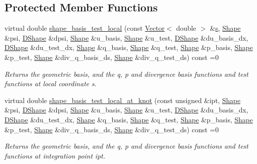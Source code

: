 \subsection*{Protected Member Functions}
\begin{DoxyCompactItemize}
\item 
virtual double \hyperlink{classoomph_1_1PoroelasticityEquations_a14fa3f0b43c4d7da65504702aef760bf}{shape\+\_\+basis\+\_\+test\+\_\+local} (const \hyperlink{classoomph_1_1Vector}{Vector}$<$ double $>$ \&\hyperlink{cfortran_8h_ab7123126e4885ef647dd9c6e3807a21c}{s}, \hyperlink{classoomph_1_1Shape}{Shape} \&psi, \hyperlink{classoomph_1_1DShape}{D\+Shape} \&dpsi, \hyperlink{classoomph_1_1Shape}{Shape} \&u\+\_\+basis, \hyperlink{classoomph_1_1Shape}{Shape} \&u\+\_\+test, \hyperlink{classoomph_1_1DShape}{D\+Shape} \&du\+\_\+basis\+\_\+dx, \hyperlink{classoomph_1_1DShape}{D\+Shape} \&du\+\_\+test\+\_\+dx, \hyperlink{classoomph_1_1Shape}{Shape} \&q\+\_\+basis, \hyperlink{classoomph_1_1Shape}{Shape} \&q\+\_\+test, \hyperlink{classoomph_1_1Shape}{Shape} \&p\+\_\+basis, \hyperlink{classoomph_1_1Shape}{Shape} \&p\+\_\+test, \hyperlink{classoomph_1_1Shape}{Shape} \&div\+\_\+q\+\_\+basis\+\_\+ds, \hyperlink{classoomph_1_1Shape}{Shape} \&div\+\_\+q\+\_\+test\+\_\+ds) const =0
\begin{DoxyCompactList}\small\item\em Returns the geometric basis, and the q, p and divergence basis functions and test functions at local coordinate s. \end{DoxyCompactList}\item 
virtual double \hyperlink{classoomph_1_1PoroelasticityEquations_a1fe3d6550d835f62011be7c2c1aa5765}{shape\+\_\+basis\+\_\+test\+\_\+local\+\_\+at\+\_\+knot} (const unsigned \&ipt, \hyperlink{classoomph_1_1Shape}{Shape} \&psi, \hyperlink{classoomph_1_1DShape}{D\+Shape} \&dpsi, \hyperlink{classoomph_1_1Shape}{Shape} \&u\+\_\+basis, \hyperlink{classoomph_1_1Shape}{Shape} \&u\+\_\+test, \hyperlink{classoomph_1_1DShape}{D\+Shape} \&du\+\_\+basis\+\_\+dx, \hyperlink{classoomph_1_1DShape}{D\+Shape} \&du\+\_\+test\+\_\+dx, \hyperlink{classoomph_1_1Shape}{Shape} \&q\+\_\+basis, \hyperlink{classoomph_1_1Shape}{Shape} \&q\+\_\+test, \hyperlink{classoomph_1_1Shape}{Shape} \&p\+\_\+basis, \hyperlink{classoomph_1_1Shape}{Shape} \&p\+\_\+test, \hyperlink{classoomph_1_1Shape}{Shape} \&div\+\_\+q\+\_\+basis\+\_\+ds, \hyperlink{classoomph_1_1Shape}{Shape} \&div\+\_\+q\+\_\+test\+\_\+ds) const =0
\begin{DoxyCompactList}\small\item\em Returns the geometric basis, and the q, p and divergence basis functions and test functions at integration point ipt. \end{DoxyCompactList}\item 

\end{DoxyCompactItemize}

